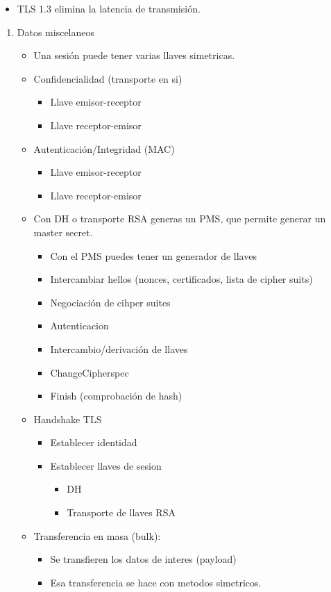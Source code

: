 \documentclass[11pt]{article}
\begin{document}
\begin{enumerate}
\begin{itemize}
\item TLS 1.3 elimina la latencia de transmisión.
\end{itemize}
\begin{enumerate}
\item Datos miscelaneos
\label{sec:org60d78dc}
\begin{itemize}
\item Una sesión puede tener varias llaves simetricas.
\item Confidencialidad (transporte en si)
\begin{itemize}
\item Llave emisor-receptor
\item Llave receptor-emisor
\end{itemize}
\item Autenticación/Integridad (MAC)
\begin{itemize}
\item Llave emisor-receptor
\item Llave receptor-emisor
\end{itemize}

\item Con DH o transporte RSA generas un PMS, que permite generar un master secret.
\begin{itemize}
\item Con el PMS puedes tener un generador de llaves

\item Intercambiar hellos (nonces, certificados, lista de cipher suits)
\item Negociación de cihper suites
\item Autenticacion
\item Intercambio/derivación de llaves
\item ChangeCipherspec
\item Finish (comprobación de hash)
\end{itemize}

\item Handshake TLS
\begin{itemize}
\item Establecer identidad
\item Establecer llaves de sesion
\begin{itemize}
\item DH
\item Transporte de llaves RSA
\end{itemize}
\end{itemize}

\item Transferencia en masa (bulk):
\begin{itemize}
\item Se transfieren los datos de interes (payload)
\item Esa transferencia se hace con metodos simetricos.
\end{itemize}


\end{itemize}
\end{enumerate}
\end{enumerate}
\end{document}
